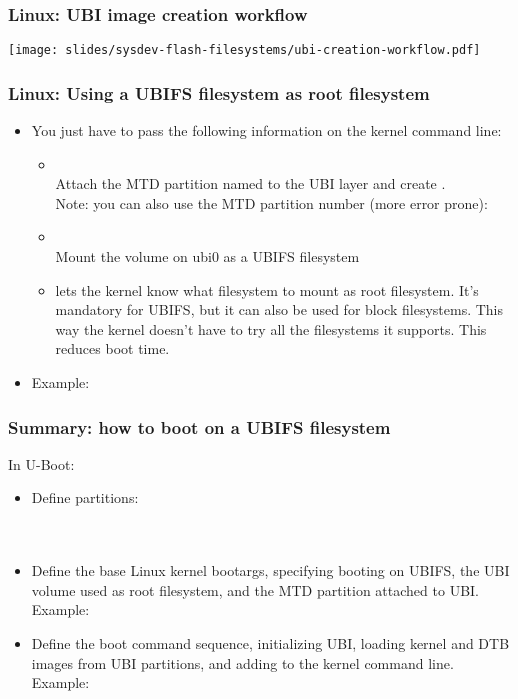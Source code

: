 \begin{frame}
  \frametitle{Linux: UBI image creation workflow}
  \begin{center}
    \texttt{[image: slides/sysdev-flash-filesystems/ubi-creation-workflow.pdf]}
  \end{center}
\end{frame}

\begin{frame}
  \frametitle{Linux: Using a UBIFS filesystem as root filesystem}
  \begin{itemize}
  \item You just have to pass the following information on the kernel
    command line:
    \begin{itemize}
    \item {}\\
      Attach the MTD partition named  to the UBI layer and
      create .\\
      Note: you can also use the MTD partition number (more error
      prone): 
    \item {}\\
      Mount the  volume on ubi0 as a UBIFS filesystem
    \item {} lets the kernel know what filesystem
      to mount as root filesystem. It's mandatory for UBIFS, but
      it can also be used for block filesystems. This way the kernel
      doesn't have to try all the filesystems it supports. This reduces
      boot time.
    \end{itemize}
  \item Example: 
  \end{itemize}
\end{frame}

\begin{frame}
  \frametitle{Summary: how to boot on a UBIFS filesystem}
  In U-Boot:
  \begin{itemize}
  \item Define partitions:\\
     \\
     \\
  \item Define the base Linux kernel bootargs, specifying booting
     on UBIFS, the UBI volume used as root filesystem, and the MTD
     partition attached to UBI. Example:\\
     {\footnotesize {}}
  \item Define the boot command sequence, initializing UBI,
     loading kernel and DTB images from UBI partitions,
     and adding  to the kernel command
     line. Example:\\
  \end{itemize}
\end{frame}

